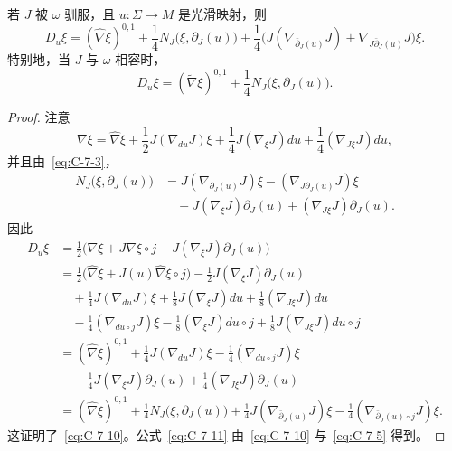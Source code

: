 \begin{lemma}\label{lem:C-7-3}
若 $J$ 被 $\omega$ 驯服，且 $u:\Sigma\to M$ 是光滑映射，则
\begin{equation}\label{eq:C-7-10}
  D_u\xi=(\widehat\nabla\xi)^{0,1}
    +\frac14N_J\bigl(\xi,\partial_J(u)\bigr)
    +\frac14\bigl(J(\nabla_{\bar\partial_J(u)}J)
                     +\nabla_{J\bar\partial_J(u)}J\bigr)\xi.
\end{equation}
特别地，当 $J$ 与 $\omega$ 相容时，
\begin{equation}\label{eq:C-7-11}
  D_u\xi=(\widetilde\nabla\xi)^{0,1}
    +\frac14N_J\bigl(\xi,\partial_J(u)\bigr).
\end{equation}
\end{lemma}
\begin{proof}
注意
\[
  \nabla\xi=\widehat\nabla\xi
    +\frac12J(\nabla_{du}J)\xi
    +\frac14J(\nabla_\xi J)du
    +\frac14(\nabla_{J\xi}J)du,
\]
并且由~\eqref{eq:C-7-3}，
\begin{align*}
  N_J\bigl(\xi,\partial_J(u)\bigr)
  &=J(\nabla_{\partial_J(u)}J)\xi
    -(\nabla_{J\partial_J(u)}J)\xi\\
  &\quad-J(\nabla_\xi J)\partial_J(u)
    +(\nabla_{J\xi}J)\partial_J(u).
\end{align*}
因此
\begin{align*}
  D_u\xi
  &=\frac12\bigl(\nabla\xi+J\nabla\xi\circ j
            -J(\nabla_\xi J)\partial_J(u)\bigr)\\
  &=\frac12\bigl(\widehat\nabla\xi
            +J(u)\widehat\nabla\xi\circ j\bigr)
            -\frac12J(\nabla_\xi J)\partial_J(u)\\
  &\quad+\frac14J(\nabla_{du}J)\xi
    +\frac18J(\nabla_\xi J)du
    +\frac18(\nabla_{J\xi}J)du\\
  &\quad-\frac14(\nabla_{du\circ j}J)\xi
    -\frac18(\nabla_\xi J)du\circ j
    +\frac18J(\nabla_{J\xi}J)du\circ j\\
  &=(\widehat\nabla\xi)^{0,1}
    +\frac14J(\nabla_{du}J)\xi
    -\frac14(\nabla_{du\circ j}J)\xi\\
  &\quad-\frac14J(\nabla_\xi J)\partial_J(u)
    +\frac14(\nabla_{J\xi}J)\partial_J(u)\\
  &=(\widehat\nabla\xi)^{0,1}
    +\frac14N_J\bigl(\xi,\partial_J(u)\bigr)
    +\frac14J(\nabla_{\bar\partial_J(u)}J)\xi
    -\frac14(\nabla_{\bar\partial_J(u)\circ j}J)\xi.
\end{align*}
这证明了~\eqref{eq:C-7-10}。公式~\eqref{eq:C-7-11} 由~\eqref{eq:C-7-10} 与~\eqref{eq:C-7-5} 得到。
\end{proof}
